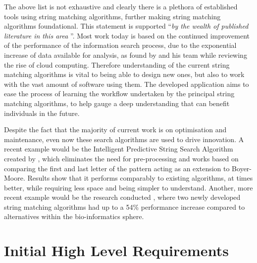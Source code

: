 The above list is not exhaustive and clearly there is a plethora of established tools using string matching algorithms, further making string matching algorithms foundational. This statement is supported ``\emph{by the wealth of published literature in this area} \citep{Stephen_1994}''. Most work today is based on the continued improvement of the performance of the information search process, due to the exponential increase of data available for analysis, as found by \cite{HASHEM201598} and his team while reviewing the rise of cloud computing. Therefore understanding of the current string matching algorithms is vital to being able to design new ones, but also to work with the vast amount of software using them. The developed application aims to ease the process of learning the workflow undertaken by the principal string matching algorithms, to help gauge a deep understanding that can benefit individuals in the future.


Despite the fact that the majority of current work is on optimisation and maintenance, even now these search algorithms are used to drive innovation. A recent example would be the Intelligent Predictive String Search Algorithm created by \cite{GURUNG2016161}, which eliminates the need for pre-processing and works based on comparing the first and last letter of the pattern acting as an extension to Boyer-Moore. Results show that it performs comparably to existing algorithms, at times better, while requiring less space and being simpler to understand. Another, more recent example would be the research conducted \cite{Ibrahim2023}, where two newly developed string matching algorithms had up to a 54\% performance increase compared to alternatives within the bio-informatics sphere.


\section{Initial High Level Requirements}
\label{intro:initial_requirements}


